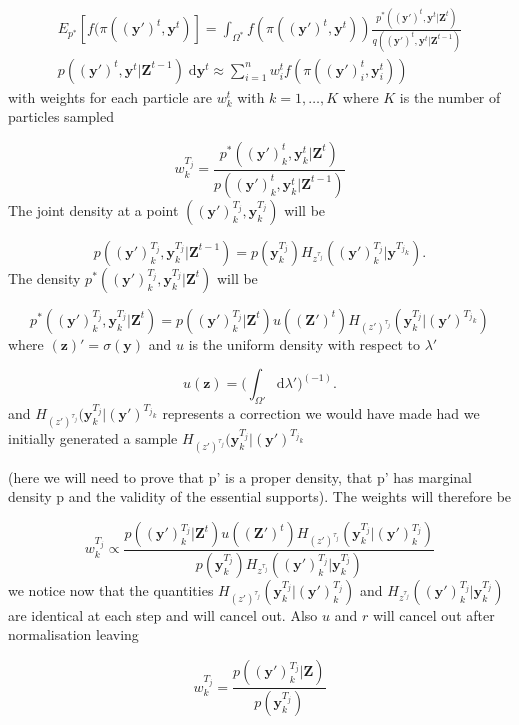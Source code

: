 \documentclass[11pt,a4paper]{article}
\newcommand{\D}{\mathrm{d}}
\renewcommand{\vec}[1]{\mathbf{#1}}
\begin{document}
{{\begin{align*}
    E_{p^*}[f(\pi (\vec{(y')}^{t}, \vec{y}^{t})] = \int_{\Omega^*} f(\pi(\vec{(y')}^{t}, \vec{y}^{t})) \frac{p^*(\vec{(y')}^{t}, \vec{y}^{t}|\vec{Z}^{t})} {q(\vec{(y')}^{t}, \vec{y}^{t} | \vec{Z}^{t-1})} \\
    p(\vec{(y')}^{t}, \vec{y}^{t} | \vec{Z}^{t-1}) \; \D \vec{y}^{t} \approx \sum_{i=1}^n  w^{t}_i f(\pi (\vec{(y')}^{t}_i, \vec{y}^{t}_i))
\end{align*}
with weights for each particle are $w^{t}_k$ with $k = 1, \dots, K$ where $K$ is the number of particles sampled

\begin{equation*}
    w^{T_j}_k = \frac{p^*(\vec{(y')}^{t}_k, \vec{y}^{t}_k | \vec{Z}^{t})} {p(\vec{(y')}^{t}_k, \vec{y}^{t}_k | \vec{Z}^{t-1})}
\end{equation*}
The joint density at a point $(\vec{(y')}^{T_j}_k, \vec{y}^{T_j}_k)$ will be 

\begin{equation*}
    p(\vec{(y')}^{T_j}_k, \vec{y}^{T_j}_k | \vec{Z}^{t-1}) = p(\vec{y}^{T_j}_k) H_{z^{\tau_j}} (\vec{(y')}^{T_j}_k | \vec{y}^{{T_j}_k}).
\end{equation*}
The density $p^*(\vec{(y')}^{T_j}_k, \vec{y}^{T_j}_k | \vec{Z}^{t})$ will be

\begin{equation*}
    p^*(\vec{(y')}^{T_j}_k, \vec{y}^{T_j}_k | \vec{Z}^{t}) = p(\vec{(y')}^{T_j}_k | \vec{Z}^{t}) u(\vec{(Z')}^{t}) H_{(z')^{\tau_j}} (\vec{y}^{T_j}_k | \vec{(y')}^{{T_j}_k})
\end{equation*}
where $(\vec{z})' = \sigma(\vec{y})$ and $u$ is the uniform density with respect to $\lambda'$ 

\begin{equation*}
    u(\vec{z}) = \Bigg( \int_{\Omega'} \D \lambda' \Bigg)^{(-1)}.
\end{equation*}
and $H_{(z')^{\tau_j}} (\vec{y}^{T_j}_k | \vec{(y')}^{{T_j}_k}$ represents a correction we would have made had we initially generated a sample $H_{(z')^{\tau_j}} (\vec{y}^{T_j}_k | \vec{(y')}^{{T_j}_k}$
}
(here we will need to prove that p' is a proper density, that p' has marginal density p and the validity of the essential supports).
The weights will therefore be 

\begin{equation*}
    w^{T_j}_k \propto \frac{p(\vec{(y')}^{T_j}_k | \vec{Z}^{t}) u(\vec{(Z')}^{t}) H_{(z')^{\tau_j}} (\vec{y}^{T_j}_k | \vec{(y')}^{T_j}_k)}{p(\vec{y}^{T_j}_k) H_{z^{\tau_j}} (\vec{(y')}^{T_j}_k | \vec{y}^{T_j}_k)}
\end{equation*}
we notice now that the quantities $H_{(z')^{\tau_j}} (\vec{y}^{T_j}_k | \vec{(y')}^{T_j}_k)$ and $H_{z^{\tau_j}} (\vec{(y')}^{T_j}_k | \vec{y}^{T_j}_k)$ are identical at each step and will cancel out. Also $u$ and $r$ will cancel out after normalisation leaving

\begin{equation*}
    w^{T_j}_k = \frac{p(\vec{(y')}^{T_j}_k | \vec{Z})}{p(\vec{y}^{T_j}_k)} 
\end{equation*}


}
\end{document}
